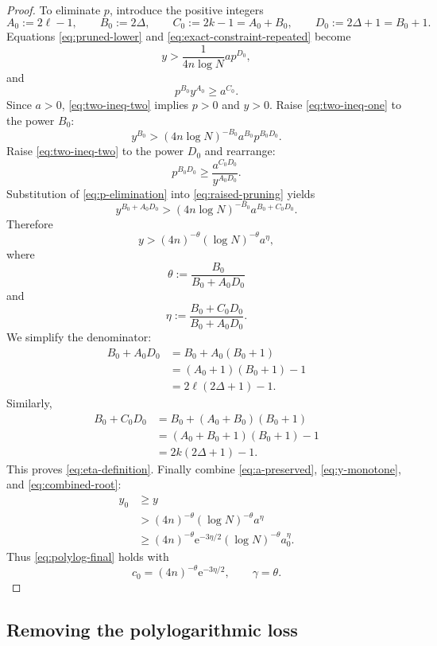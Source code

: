 \documentclass[11pt]{article}
\newcommand{\1}{\mathbf{1}}
\newcommand{\e}{\mathrm{e}}
\begin{document}
\begin{proof}
To eliminate $p$, introduce the positive integers
\[
  A_0:=2\ell-1,
  \qquad
  B_0:=2\Delta,
  \qquad
  C_0:=2k-1=A_0+B_0,
  \qquad
  D_0:=2\Delta+1=B_0+1.
\]
Equations \eqref{eq:pruned-lower} and
\eqref{eq:exact-constraint-repeated} become
\[
  y>\frac{1}{4n\log N}a p^{D_0},
  \tag{7.22}\label{eq:two-ineq-one}
\]
and
\[
  p^{B_0}y^{A_0}\ge a^{C_0}.
  \tag{7.23}\label{eq:two-ineq-two}
\]
Since $a>0$, \eqref{eq:two-ineq-two} implies $p>0$ and $y>0$.  Raise
\eqref{eq:two-ineq-one} to the power $B_0$:
\[
  y^{B_0}
  >
  (4n\log N)^{-B_0}a^{B_0}p^{B_0D_0}.
  \tag{7.24}\label{eq:raised-pruning}
\]
Raise \eqref{eq:two-ineq-two} to the power $D_0$ and rearrange:
\[
  p^{B_0D_0}
  \ge
  \frac{a^{C_0D_0}}{y^{A_0D_0}}.
  \tag{7.25}\label{eq:p-elimination}
\]
Substitution of \eqref{eq:p-elimination} into
\eqref{eq:raised-pruning} yields
\[
  y^{B_0+A_0D_0}
  >
  (4n\log N)^{-B_0}a^{B_0+C_0D_0}.
  \tag{7.26}\label{eq:combined-power}
\]
Therefore
\[
  y
  >
  (4n)^{-\theta}(\log N)^{-\theta}
  a^{\eta},
  \tag{7.27}\label{eq:combined-root}
\]
where
\[
  \theta:=\frac{B_0}{B_0+A_0D_0}
\]
and
\[
  \eta:=\frac{B_0+C_0D_0}{B_0+A_0D_0}.
\]
We simplify the denominator:
\[
\begin{aligned}
  B_0+A_0D_0
  &=B_0+A_0(B_0+1)\\
  &=(A_0+1)(B_0+1)-1\\
  &=2\ell(2\Delta+1)-1.
\end{aligned}
\]
Similarly,
\[
\begin{aligned}
  B_0+C_0D_0
  &=B_0+(A_0+B_0)(B_0+1)\\
  &=(A_0+B_0+1)(B_0+1)-1\\
  &=2k(2\Delta+1)-1.
\end{aligned}
\]
This proves \eqref{eq:eta-definition}.  Finally combine
\eqref{eq:a-preserved}, \eqref{eq:y-monotone}, and
\eqref{eq:combined-root}:
\[
\begin{aligned}
  y_0
  &\ge y\\
  &>(4n)^{-\theta}(\log N)^{-\theta}a^\eta\\
  &\ge
  (4n)^{-\theta}\e^{-3\eta/2}
  (\log N)^{-\theta}a_0^\eta.
\end{aligned}
\]
Thus \eqref{eq:polylog-final} holds with
\[
  c_0=(4n)^{-\theta}\e^{-3\eta/2},
  \qquad
  \gamma=\theta.
\]
\end{proof}

\subsection{Removing the polylogarithmic loss}
\end{document}
